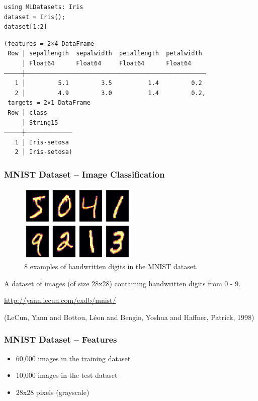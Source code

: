 \documentclass[10pt]{beamer}
\begin{document}
\begin{verbatim}
using MLDatasets: Iris
dataset = Iris();
dataset[1:2]
\end{verbatim}

\begin{verbatim}
(features = 2×4 DataFrame
 Row │ sepallength  sepalwidth  petallength  petalwidth
     │ Float64      Float64     Float64      Float64
─────┼──────────────────────────────────────────────────
   1 │         5.1         3.5          1.4         0.2
   2 │         4.9         3.0          1.4         0.2,
 targets = 2×1 DataFrame
 Row │ class
     │ String15
─────┼─────────────
   1 │ Iris-setosa
   2 │ Iris-setosa)
\end{verbatim}

\subsubsection*{MNIST Dataset -- Image Classification}
\label{sec:org436e7ca}

\begin{figure}[htbp]
\centering
\includegraphics[width=0.5\textwidth]{images/mnist.png}
\caption{8 examples of handwritten digits in the MNIST dataset.}
\end{figure}

A dataset of images (of size 28x28) containing handwritten digits from 0 - 9.

\url{http://yann.lecun.com/exdb/mnist/}

(LeCun, Yann and Bottou, L{\'e}on and Bengio, Yoshua and Haffner, Patrick, 1998)

\subsubsection*{MNIST Dataset -- Features}
\label{sec:org6233bae}

\begin{itemize}
\item 60,000 images in the training dataset
\item 10,000 images in the test dataset
\item 28x28 pixels (grayscale)
\end{itemize}
\end{document}
